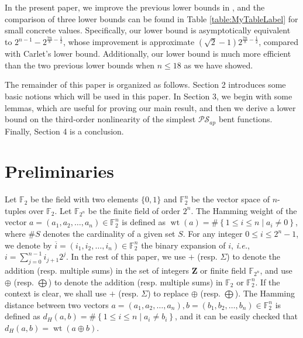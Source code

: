 \documentclass{article}
\newcommand{\Z}{\mathbf{Z}}
\newcommand{\F}{\mathbb{F}}
\newcommand{\0}{\textbf{0}}
\newcommand{\1}{\textbf{1}}
\newcommand{\wt}{\operatorname{wt}}
\theoremstyle{plain}
\begin{document}
    In the present paper,
    we improve the previous lower bounds in \cite{TangCT2013NL_2bent,Carlet2011NL_Profile_Dillon}, and the comparison of three lower bounds can be found in Table \ref{table:MyTableLabel} for small concrete values.
    Specifically, our lower bound is asymptotically equivalent to $2^{n-1}-2^{\frac{7n}{8}-\frac{1}{2}}$, whose
    improvement is approximate $(\sqrt{2}-1)2^{\frac{7n}{8}-\frac{1}{2}}$, compared with Carlet's lower bound.
    Additionally, our lower bound is much more efficient than the two previous lower bounds when $n\le 18$ as we have showed.

    The remainder of this paper is organized as follows.
    Section 2 introduces some basic notions which will be used in this paper.
    In Section 3, we begin with some lemmas, which are useful for proving our main result, and then we derive a lower bound on the third-order nonlinearity of the simplest $\mathcal{PS}_{ap}$ bent functions.
    Finally, Section 4 is a conclusion.

\section{Preliminaries}
    Let $\F_2$ be the field with two elements $\{0,1\}$ and $\F_2^n$ be the vector space of $n$-tuples over $\F_2$.
    Let $\F_{2^n}$ be the finite field of order $2^n$.
    The Hamming weight of the vector $a=(a_1,a_2,\dots,a_n)\in\F_2^n$ is defined as $\wt(a)=\#\left\{ 1\le i\le n\mid a_i\ne 0 \right\}$, where $\#S$ denotes the cardinality of a given set $S$.
    For any integer $0\le i \le 2^n-1$, we denote by $\overline{i}=(i_1,i_2,\dots,i_n)\in\F_2^n$ the binary expansion of $i$, \emph{i.e.}, $i=\sum_{j=0}^{n-1}i_{j+1}2^j$.
    In the rest of this paper, we use $+$ (resp. $\Sigma$) to denote the addition (resp. multiple sums) in  the set of integers $\Z$ or finite field $\F_{2^n}$, and use $\oplus$ (resp. $\bigoplus$) to denote the addition (resp. multiple sums) in $\F_2$ or $\F_2^n$.
    If the context is clear, we shall use $+$ (resp. $\Sigma$) to replace $\oplus$ (resp. $\bigoplus$).
    The Hamming distance between two vectors $a=(a_1,a_2,\dots,a_n),b=(b_1,b_2,\dots,b_n)\in\F_2^n$ is defined as $d_H(a,b)=\#\left\{ 1\le i\le n\middle| a_i\ne b_i \right\}$, and it can be easily checked that $d_H(a,b)=\wt(a\oplus b)$.
\end{document}
